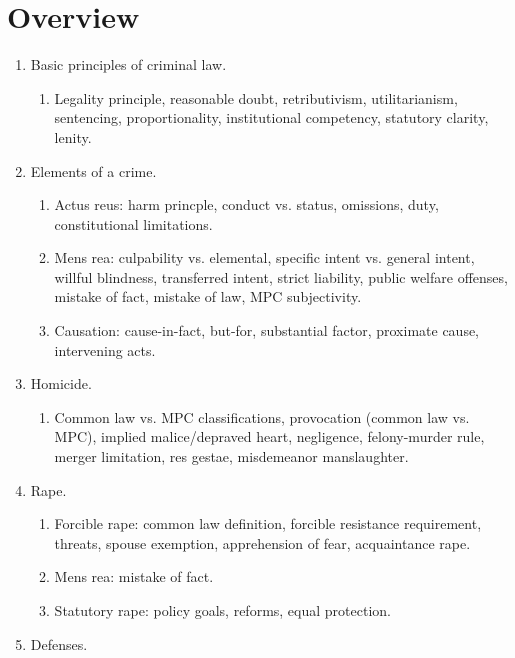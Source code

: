 \section{Overview}

\begin{enumerate}
    \item Basic principles of criminal law.
    \begin{enumerate}
        \item Legality principle, reasonable doubt, retributivism, 
        utilitarianism, sentencing, proportionality, institutional competency, 
        statutory clarity, lenity.
    \end{enumerate}
    \item Elements of a crime.
    \begin{enumerate}
        \item Actus reus: harm princple, conduct vs. status, omissions, duty, 
        constitutional limitations.
        \item Mens rea: culpability vs. elemental, specific intent vs. general 
        intent, willful blindness, transferred intent, strict liability, 
        public welfare offenses, mistake of fact, mistake of law, MPC 
        subjectivity.
        \item Causation: cause-in-fact, but-for, substantial factor, proximate 
        cause, intervening acts.
    \end{enumerate}
    \item Homicide.
    \begin{enumerate}
        \item Common law vs. MPC classifications, provocation (common law vs. 
        MPC), implied malice/depraved heart, negligence, felony-murder rule, 
        merger limitation, res gestae, misdemeanor manslaughter.
    \end{enumerate}
    \item Rape.
    \begin{enumerate}
        \item Forcible rape: common law definition, forcible resistance 
        requirement, threats, spouse exemption, apprehension of fear, 
        acquaintance rape.
        \item Mens rea: mistake of fact.
        \item Statutory rape: policy goals, reforms, equal protection.
    \end{enumerate}
    \item Defenses.
    \begin{enumerate}

\end{enumerate}
\end{enumerate}
